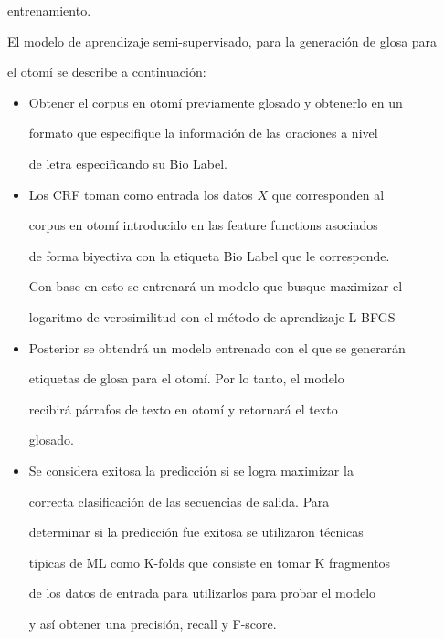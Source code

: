 \documentclass[letterpaper,12pt,oneside]{book}
\begin{document}
	entrenamiento.

	
	El modelo de aprendizaje semi-supervisado, para la generación de glosa para

	el otomí se describe a continuación:

	

	
	\begin{itemize}

		\item Obtener el corpus en otomí previamente glosado y obtenerlo en un

		formato que especifique la información de las oraciones a nivel

		de letra especificando su Bio Label.

		\item Los CRF toman como entrada los datos $X$ que corresponden al

		corpus en otomí introducido en las feature functions asociados

		de forma biyectiva con la etiqueta Bio Label que le corresponde.

		Con base en esto se entrenará un modelo que busque maximizar el

		logaritmo de verosimilitud con el método de aprendizaje L-BFGS

		\item Posterior se obtendrá un modelo entrenado con el que se generarán

		etiquetas de glosa para el otomí. Por lo tanto, el modelo

		recibirá párrafos de texto en otomí y retornará el texto

		glosado.

		\item Se considera exitosa la predicción si se logra maximizar la

		correcta clasificación de las secuencias de salida. Para

		determinar si la predicción fue exitosa se utilizaron técnicas

		típicas de ML como K-folds que consiste en tomar K fragmentos

		de los datos de entrada para utilizarlos para probar el modelo

		y así obtener una precisión, recall y F-score.

	\end{itemize}

	
	
\end{document}

